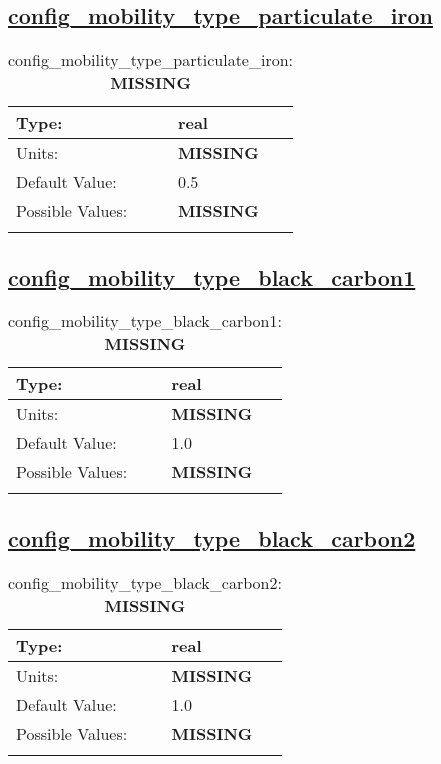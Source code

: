 \subsection[config\_mobility\_type\_particulate\_iron]{\hyperref[sec:nm_tab_biogeochemistry]{config\_mobility\_type\_particulate\_iron}}
\label{subsec:nm_sec_config_mobility_type_particulate_iron}
\begin{center}
\begin{longtable}{| p{2.0in} || p{4.0in} |}
    \hline
    Type: & real \\
    \hline
    Units: & {\bf \color{red} MISSING} \\
    \hline
    Default Value: & 0.5 \\
    \hline
    Possible Values: & {\bf \color{red} MISSING} \\
    \hline
    \caption{config\_mobility\_type\_particulate\_iron: {\bf \color{red} MISSING}}
\end{longtable}
\end{center}
\subsection[config\_mobility\_type\_black\_carbon1]{\hyperref[sec:nm_tab_biogeochemistry]{config\_mobility\_type\_black\_carbon1}}
\label{subsec:nm_sec_config_mobility_type_black_carbon1}
\begin{center}
\begin{longtable}{| p{2.0in} || p{4.0in} |}
    \hline
    Type: & real \\
    \hline
    Units: & {\bf \color{red} MISSING} \\
    \hline
    Default Value: & 1.0 \\
    \hline
    Possible Values: & {\bf \color{red} MISSING} \\
    \hline
    \caption{config\_mobility\_type\_black\_carbon1: {\bf \color{red} MISSING}}
\end{longtable}
\end{center}
\subsection[config\_mobility\_type\_black\_carbon2]{\hyperref[sec:nm_tab_biogeochemistry]{config\_mobility\_type\_black\_carbon2}}
\label{subsec:nm_sec_config_mobility_type_black_carbon2}
\begin{center}
\begin{longtable}{| p{2.0in} || p{4.0in} |}
    \hline
    Type: & real \\
    \hline
    Units: & {\bf \color{red} MISSING} \\
    \hline
    Default Value: & 1.0 \\
    \hline
    Possible Values: & {\bf \color{red} MISSING} \\
    \hline
    \caption{config\_mobility\_type\_black\_carbon2: {\bf \color{red} MISSING}}
\end{longtable}
\end{center}
